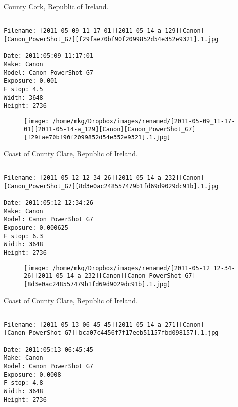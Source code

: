 \clearpage
\onecolumn
\noindent County Cork, Republic of Ireland.
\noindent
\begin{lstlisting}

Filename: [2011-05-09_11-17-01][2011-05-14-a_129][Canon][Canon_PowerShot_G7][f29fae70bf90f2099852d54e352e9321].1.jpg

Date: 2011:05:09 11:17:01
Make: Canon
Model: Canon PowerShot G7
Exposure: 0.001
F stop: 4.5
Width: 3648
Height: 2736
\end{lstlisting}
\clearpage

\begin{figure}
\texttt{[image: /home/mkg/Dropbox/images/renamed/[2011-05-09\_11-17-01][2011-05-14-a\_129][Canon][Canon\_PowerShot\_G7][f29fae70bf90f2099852d54e352e9321].1.jpg]}
\end{figure}
    
\clearpage
\onecolumn
\noindent Coast of County Clare, Republic of Ireland.
\noindent
\begin{lstlisting}

Filename: [2011-05-12_12-34-26][2011-05-14-a_232][Canon][Canon_PowerShot_G7][8d3e0ac248557479b1fd69d9029dc91b].1.jpg

Date: 2011:05:12 12:34:26
Make: Canon
Model: Canon PowerShot G7
Exposure: 0.000625
F stop: 6.3
Width: 3648
Height: 2736
\end{lstlisting}
\clearpage

\begin{figure}
\texttt{[image: /home/mkg/Dropbox/images/renamed/[2011-05-12\_12-34-26][2011-05-14-a\_232][Canon][Canon\_PowerShot\_G7][8d3e0ac248557479b1fd69d9029dc91b].1.jpg]}
\end{figure}
    
\clearpage
\onecolumn
\noindent Coast of County Clare, Republic of Ireland.
\noindent
\begin{lstlisting}

Filename: [2011-05-13_06-45-45][2011-05-14-a_271][Canon][Canon_PowerShot_G7][bca07c4456f7f17eeb51157fbd098157].1.jpg

Date: 2011:05:13 06:45:45
Make: Canon
Model: Canon PowerShot G7
Exposure: 0.0008
F stop: 4.8
Width: 3648
Height: 2736
\end{lstlisting}
\clearpage

